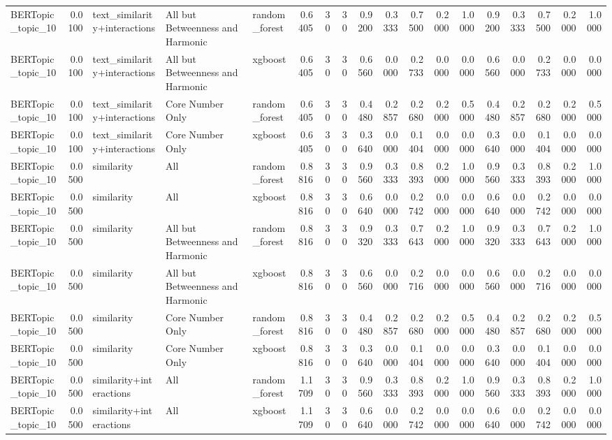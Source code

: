 \begin{tabular}{lrlllrrrrrrrrrrrrr}
BERTopic_topic_10 & 0.0100 & text_similarity+interactions & All but Betweenness and Harmonic & random_forest & 0.6405 & 30 & 30 & 0.9200 & 0.3333 & 0.7500 & 0.2000 & 1.0000 & 0.9200 & 0.3333 & 0.7500 & 0.2000 & 1.0000 \\
BERTopic_topic_10 & 0.0100 & text_similarity+interactions & All but Betweenness and Harmonic & xgboost & 0.6405 & 30 & 30 & 0.6560 & 0.0000 & 0.2733 & 0.0000 & 0.0000 & 0.6560 & 0.0000 & 0.2733 & 0.0000 & 0.0000 \\
BERTopic_topic_10 & 0.0100 & text_similarity+interactions & Core Number Only & random_forest & 0.6405 & 30 & 30 & 0.4480 & 0.2857 & 0.2680 & 0.2000 & 0.5000 & 0.4480 & 0.2857 & 0.2680 & 0.2000 & 0.5000 \\
BERTopic_topic_10 & 0.0100 & text_similarity+interactions & Core Number Only & xgboost & 0.6405 & 30 & 30 & 0.3640 & 0.0000 & 0.1404 & 0.0000 & 0.0000 & 0.3640 & 0.0000 & 0.1404 & 0.0000 & 0.0000 \\
BERTopic_topic_10 & 0.0500 & similarity & All & random_forest & 0.8816 & 30 & 30 & 0.9560 & 0.3333 & 0.8393 & 0.2000 & 1.0000 & 0.9560 & 0.3333 & 0.8393 & 0.2000 & 1.0000 \\
BERTopic_topic_10 & 0.0500 & similarity & All & xgboost & 0.8816 & 30 & 30 & 0.6640 & 0.0000 & 0.2742 & 0.0000 & 0.0000 & 0.6640 & 0.0000 & 0.2742 & 0.0000 & 0.0000 \\
BERTopic_topic_10 & 0.0500 & similarity & All but Betweenness and Harmonic & random_forest & 0.8816 & 30 & 30 & 0.9320 & 0.3333 & 0.7643 & 0.2000 & 1.0000 & 0.9320 & 0.3333 & 0.7643 & 0.2000 & 1.0000 \\
BERTopic_topic_10 & 0.0500 & similarity & All but Betweenness and Harmonic & xgboost & 0.8816 & 30 & 30 & 0.6560 & 0.0000 & 0.2716 & 0.0000 & 0.0000 & 0.6560 & 0.0000 & 0.2716 & 0.0000 & 0.0000 \\
BERTopic_topic_10 & 0.0500 & similarity & Core Number Only & random_forest & 0.8816 & 30 & 30 & 0.4480 & 0.2857 & 0.2680 & 0.2000 & 0.5000 & 0.4480 & 0.2857 & 0.2680 & 0.2000 & 0.5000 \\
BERTopic_topic_10 & 0.0500 & similarity & Core Number Only & xgboost & 0.8816 & 30 & 30 & 0.3640 & 0.0000 & 0.1404 & 0.0000 & 0.0000 & 0.3640 & 0.0000 & 0.1404 & 0.0000 & 0.0000 \\
BERTopic_topic_10 & 0.0500 & similarity+interactions & All & random_forest & 1.1709 & 30 & 30 & 0.9560 & 0.3333 & 0.8393 & 0.2000 & 1.0000 & 0.9560 & 0.3333 & 0.8393 & 0.2000 & 1.0000 \\
BERTopic_topic_10 & 0.0500 & similarity+interactions & All & xgboost & 1.1709 & 30 & 30 & 0.6640 & 0.0000 & 0.2742 & 0.0000 & 0.0000 & 0.6640 & 0.0000 & 0.2742 & 0.0000 & 0.0000 \\

\end{tabular}
